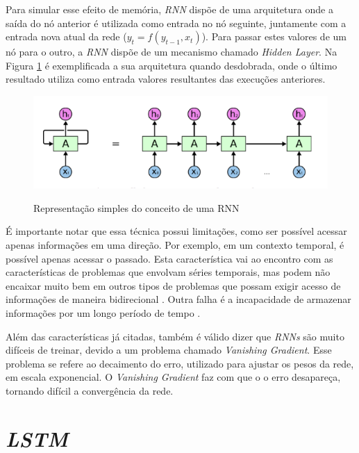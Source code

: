 Para simular esse efeito de memória, \textit{\acrshort{RNN}} dispõe de uma arquitetura onde a saída do nó anterior é utilizada como entrada no nó seguinte, juntamente com a entrada nova atual da rede (\(y_t = f(y_{t-1}, x_t)\)). Para passar estes valores de um nó para o outro, a \textit{\acrshort{RNN}} dispõe de um mecanismo chamado \textit{Hidden Layer}. Na Figura \ref{figure:rnn} é exemplificada a sua arquitetura quando desdobrada, onde o último resultado utiliza como entrada valores resultantes das execuções anteriores.

\begin{figure}[htbp]
    \centering
    \includegraphics[scale=0.4]{monography/img/models/rnnExample.png}
    \label{figure:rnn}
    \caption[Representação simples do conceito de um RNN]{Representação simples do conceito de uma RNN \footnotemark}
\end{figure}

É importante notar que essa técnica possui limitações, como ser possível acessar apenas informações em uma direção. Por exemplo, em um contexto temporal, é possível apenas acessar o passado. Esta característica vai ao encontro com as características de problemas que envolvam séries temporais, mas podem não encaixar muito bem em outros tipos de problemas que possam exigir acesso de informações de maneira bidirecional \cite{alex2012}. Outra falha é a incapacidade de armazenar informações por um longo período de tempo \cite{hochreiter2001gradient}. 

Além das características já citadas, também é válido dizer que \textit{\acrshort{RNN}s} são muito difíceis de treinar, devido a um problema chamado \textit{Vanishing Gradient}. Esse problema se refere ao decaimento do erro, utilizado para ajustar os pesos da rede, em escala exponencial. O \textit{Vanishing Gradient} faz com que o o erro desapareça, tornando difícil a convergência da rede. \cite{doi:10.1162/neco.1997.9.8.1735}

\section{\textit{\acrfull{LSTM}}}

